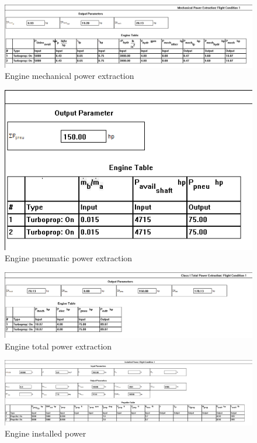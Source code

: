\documentclass[conf]{new-aiaa}
\begin{document}
\begin{figure}[H]
	\centering
	\includegraphics[width=\textwidth]{TwinSeaLionReport2Printouts/enginemechpowerextraction}
	\caption{Engine mechanical power extraction}
	\label{fig:enginemechpowerextraction}
\end{figure}
\begin{figure}[H]
	\centering
	\includegraphics[width=\textwidth]{TwinSeaLionReport2Printouts/enginepneumaticpowerextraction}
	\caption{Engine pneumatic power extraction}
	\label{fig:enginepneumaticpowerextraction}
\end{figure}
\begin{figure}[H]
	\centering
	\includegraphics[width=\textwidth]{TwinSeaLionReport2Printouts/engineTotalPowerExtraction}
	\caption{Engine total power extraction}
	\label{fig:engineTotalPowerExtraction}
\end{figure}
\begin{figure}[H]
	\centering
	\includegraphics[width=\textwidth]{TwinSeaLionReport2Printouts/engineInstalledPower}
	\caption{Engine installed power}
	\label{fig:engineInstalledPower}
\end{figure}
\end{document}
